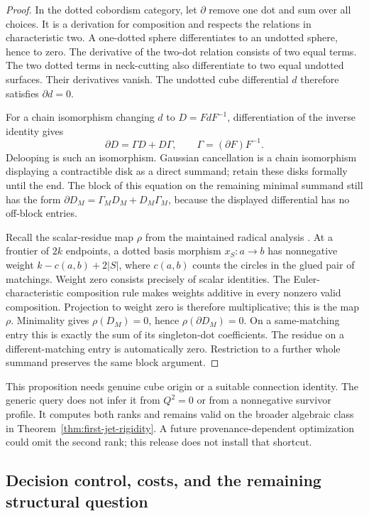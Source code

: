 \begin{proof}
In the dotted cobordism category, let $\partial$ remove one dot and sum
over all choices. It is a derivation for composition and respects the
relations in characteristic two. A one-dotted sphere differentiates
to an undotted sphere, hence to zero. The derivative of the two-dot
relation consists of two equal terms. The two dotted terms in
neck-cutting also differentiate to two equal undotted surfaces.
Their derivatives vanish. The undotted cube differential $d$ therefore
satisfies $\partial d=0$.

For a chain isomorphism changing $d$ to $D=FdF^{-1}$, differentiation
of the inverse identity gives
\[
 \partial D=\Gamma D+D\Gamma,\qquad \Gamma=(\partial F)F^{-1}.
\]
Delooping is such an isomorphism. Gaussian cancellation is a chain
isomorphism displaying a contractible disk as a direct summand;
retain these disks formally until the end. The block of this equation
on the remaining minimal summand still has the form
$\partial D_M=\Gamma_M D_M+D_M\Gamma_M$, because the displayed
differential has no off-block entries.

Recall the scalar-residue map $\rho$ from the maintained radical analysis
\cite{RadicalPrior}. At a frontier of $2k$ endpoints, a dotted basis
morphism $x_S:a\to b$ has nonnegative weight
$k-c(a,b)+2|S|$, where $c(a,b)$ counts the circles in the glued pair
of matchings. Weight zero consists precisely of scalar identities.
The Euler-characteristic composition rule makes weights additive in
every nonzero valid composition. Projection to weight zero is therefore
multiplicative; this is the map $\rho$.
Minimality gives $\rho(D_M)=0$, hence
$\rho(\partial D_M)=0$. On a same-matching entry this is exactly
the sum of its singleton-dot coefficients. The residue on a
different-matching entry is automatically zero. Restriction to a further
whole summand preserves the same block argument.
\end{proof}

This proposition needs genuine cube origin or a suitable connection
identity. The generic query does not infer it from $Q^2=0$ or from a
nonnegative survivor profile. It computes both ranks and remains valid
on the broader algebraic class in Theorem~\ref{thm:first-jet-rigidity}.
A future provenance-dependent optimization could omit the second rank;
this release does not install that shortcut.

\subsection{Decision control, costs, and the remaining structural question}

